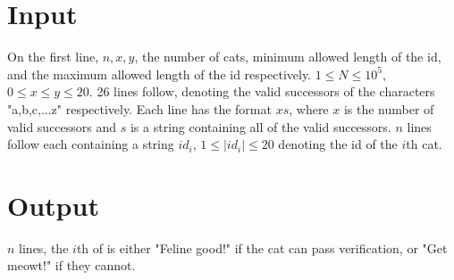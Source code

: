 \section*{Input}
On the first line, $n, x, y$, the number of cats, minimum allowed length of the id, and the maximum allowed length of the id respectively. $1 \leq N \leq 10^5$, $0 \leq x \leq y \leq 20$.
26 lines follow, denoting the valid successors of the characters "a,b,c,...z" respectively. Each line has the format $x s$, where $x$ is the number of valid successors and $s$ is a string containing all of the valid successors.
$n$ lines follow each containing a string $id_i$, $1 \leq |id_i| \leq 20$ denoting the id of the $i$th cat.

\section*{Output}
$n$ lines, the $i$th of is either "Feline good!" if the cat can pass verification, or "Get meowt!" if they cannot.
